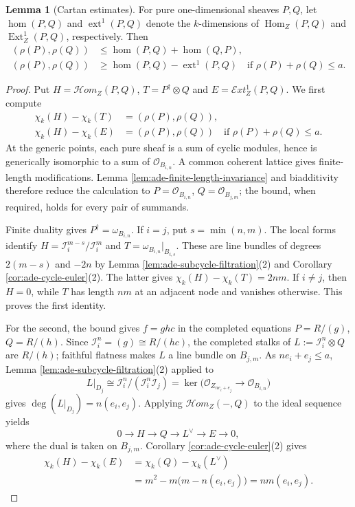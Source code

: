 \documentclass[a4paper,reqno]{amsart}
\def\I{\mathcal{I}}
\def\O{\mathcal{O}}
\DeclareMathOperator{\Hom}{Hom}
\DeclareMathOperator{\Ext}{Ext}
\theoremstyle{definition}
\newtheorem{Lem}[Thm]{Lemma}
\begin{document}
\begin{Lem}[Cartan estimates]\label{lem:ade-cartan-estimates}
For pure one-dimensional sheaves $P,Q$, let $\hom(P,Q)$ and $\operatorname{ext}^1(P,Q)$ denote the $k$-dimensions of $\Hom_Z(P,Q)$ and $\Ext_Z^1(P,Q)$, respectively. Then
\begin{equation}\label{eq:ade-bounded-global}
\begin{aligned}
(\rho(P),\rho(Q))&\le\hom(P,Q)+\hom(Q,P),\\
(\rho(P),\rho(Q))&\ge\hom(P,Q)-\operatorname{ext}^1(P,Q)
\quad\text{if }\rho(P)+\rho(Q)\le a.
\end{aligned}
\end{equation}
\end{Lem}
\begin{proof}
Put $H=\mathcal Hom_Z(P,Q)$, $T=P^\dagger\otimes Q$ and $E=\mathcal Ext_Z^1(P,Q)$. We first compute
\begin{equation}\label{eq:ade-cartan-indices}
\begin{aligned}
\chi_k(H)-\chi_k(T)&=(\rho(P),\rho(Q)),\\
\chi_k(H)-\chi_k(E)&=(\rho(P),\rho(Q))
\quad\text{if }\rho(P)+\rho(Q)\le a.
\end{aligned}
\end{equation}
At the generic points, each pure sheaf is a sum of cyclic modules, hence is generically isomorphic to a sum of $\O_{B_{i,n}}$. A common coherent lattice gives finite-length modifications. Lemma \ref{lem:ade-finite-length-invariance} and biadditivity therefore reduce the calculation to $P=\O_{B_{i,n}}$, $Q=\O_{B_{j,m}}$; the bound, when required, holds for every pair of summands.

Finite duality gives $P^\dagger=\omega_{B_{i,n}}$. If $i=j$, put $s=\min(n,m)$. The local forms identify $H=\I_i^{m-s}/\I_i^m$ and $T=\omega_{B_{i,n}}|_{B_{i,s}}$. These are line bundles of degrees $2(m-s)$ and $-2n$ by Lemma \ref{lem:ade-subcycle-filtration}(2) and Corollary \ref{cor:ade-cycle-euler}(2). The latter gives $\chi_k(H)-\chi_k(T)=2nm$. If $i\ne j$, then $H=0$, while $T$ has length $nm$ at an adjacent node and vanishes otherwise. This proves the first identity.

For the second, the bound gives $f=ghc$ in the completed equations $P=R/(g)$, $Q=R/(h)$. Since $\I_i^n=(g)\cong R/(hc)$, the completed stalks of $L:=\I_i^n\otimes Q$ are $R/(h)$; faithful flatness makes $L$ a line bundle on $B_{j,m}$. As $ne_i+e_j\le a$, Lemma \ref{lem:ade-subcycle-filtration}(2) applied to
\[
L|_{D_j}\cong\I_i^n/(\I_i^n\I_j)
=\ker\bigl(\O_{Z_{ne_i+e_j}}\longrightarrow\O_{B_{i,n}}\bigr)
\]
gives $\deg(L|_{D_j})=n(e_i,e_j)$. Applying $\mathcal Hom_Z(-,Q)$ to the ideal sequence yields
\[
0\longrightarrow H\longrightarrow Q\longrightarrow L^\vee
\longrightarrow E\longrightarrow0,
\]
where the dual is taken on $B_{j,m}$. Corollary \ref{cor:ade-cycle-euler}(2) gives
\[
\begin{aligned}
\chi_k(H)-\chi_k(E)&=\chi_k(Q)-\chi_k(L^\vee)\\
&=m^2-m\bigl(m-n(e_i,e_j)\bigr)=nm(e_i,e_j).
\end{aligned}
\]


\end{proof}
\end{document}

